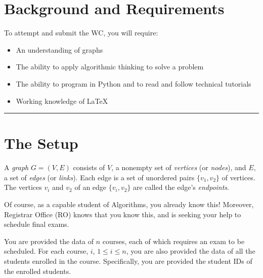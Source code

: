 \documentclass[a4paper]{exam}
\begin{document}
\section*{Background and Requirements}

To attempt and submit the WC, you will require:
\begin{itemize}
\item An understanding of graphs
\item The ability to apply algorithmic thinking to solve a problem
\item The ability to program in Python and to read and follow technical tutorials
\item Working knowledge of \LaTeX
\end{itemize}

\begin{center}
  \rule{300pt}{1pt}
  
\end{center}
\newpage
\section*{The Setup}

A \textit{graph} $G= (V, E)$ consists of $V$, a nonempty set of \textit{vertices} (or \textit{nodes}), and $E$, a set of \textit{edges} (or \textit{links}). Each edge is a set of unordered pairs $\{v_1, v_2\}$ of vertices. The vertices $v_i$ and $v_2$ of an edge $\{v_i, v_2\}$ are called the edge's \textit{endpoints}. 

Of course, as a capable student of Algorithms, you already know this! Moreover, Registrar Office (RO) knows that you know this, and is seeking your help to schedule final exams.

You are provided the data of $n$ courses, each of which requires an exam to be scheduled. For each course, $i$, $1\le i \le n$, you are also provided the data of all the students enrolled in the course. Specifically, you are provided the student IDs of the enrolled students.
\end{document}
